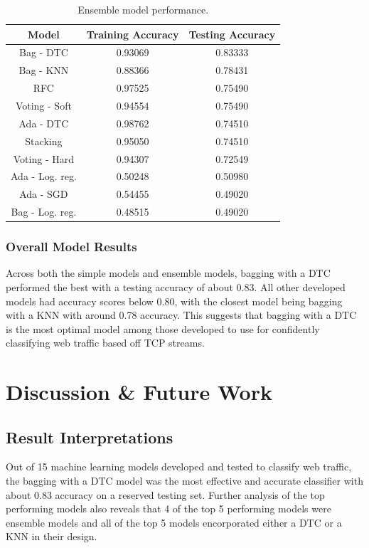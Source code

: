 \documentclass[10pt,sigconf,letterpaper,nonacm]{acmart}
\begin{document}
\begin{table}[h]
  \caption{Ensemble model performance.}
  \label{tab:ensemble}
  \begin{tabular}{ccc}
    \toprule
    Model & Training Accuracy & Testing Accuracy \\
    \midrule
    Bag - DTC & 0.93069 & 0.83333 \\
    Bag - KNN & 0.88366 & 0.78431 \\
    RFC & 0.97525 & 0.75490 \\
    Voting - Soft & 0.94554 & 0.75490 \\
    Ada - DTC & 0.98762 & 0.74510 \\
    Stacking & 0.95050 & 0.74510 \\
    Voting - Hard & 0.94307 & 0.72549 \\
    Ada - Log. reg. & 0.50248 & 0.50980 \\
    Ada - SGD & 0.54455 & 0.49020 \\
    Bag - Log. reg. & 0.48515 & 0.49020 \\
    \bottomrule
  \end{tabular}
\end{table}

\subsubsection{Overall Model Results}

Across both the simple models and ensemble models, bagging with a DTC performed the best with a testing accuracy of about 0.83.
All other developed models had accuracy scores below 0.80, with the closest model being bagging with a KNN with around 0.78 accuracy.
This suggests that bagging with a DTC is the most optimal model among those developed to use for confidently classifying web traffic based off TCP streams.


\section{Discussion \& Future Work}

\subsection{Result Interpretations}

Out of 15 machine learning models developed and tested to classify web traffic, the bagging with a DTC model was the most effective and accurate classifier with about 0.83 accuracy on a reserved testing set.
Further analysis of the top performing models also reveals that 4 of the top 5 performing models were ensemble models and all of the top 5 models encorporated either a DTC or a KNN in their design.
\end{document}
